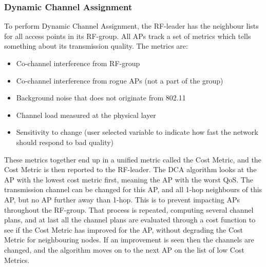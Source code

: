 \subsubsection{Dynamic Channel Assignment}
To perform Dynamic Channel Assignment, the RF-leader has the neighbour lists for all access points in 
its RF-group. All APs track a set of metrics which tells something about its transmission quality. The metrics are: 
\begin{itemize}
	\item Co-channel interference from RF-group
	\item Co-channel interference from rogue APs (not a part of the group)
	\item Background noise that does not originate from 802.11
	\item Channel load measured at the physical layer
	\item Sensitivity to change (user selected variable to indicate how fast the network should respond to bad quality)
\end{itemize}
These metrics together end up in a unified metric called the Cost Metric, and the Cost Metric is then reported to the RF-leader. 
The DCA algorithm looks at the AP with the lowest cost metric first, meaning the AP with the worst QoS. The transmission channel can be changed for
this AP, and all 1-hop neighbours of this AP, but no AP further away than 1-hop. This is to prevent impacting APs throughout the RF-group.
That process is repeated, computing several channel plans, and at last all the channel plans are evaluated through a cost function
to see if the Cost Metric has improved for the AP, without degrading the Cost Metric for neighbouring nodes. If an improvement is seen
then the channels are changed, and the algorithm moves on to the next AP on the list of low Cost Metrics.  

